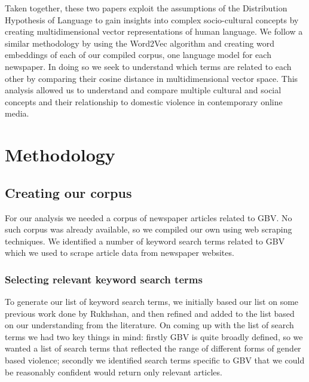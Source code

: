 \documentclass{article}
\begin{document}
{{Taken together, these two papers exploit the assumptions of the Distribution Hypothesis of Language to gain insights into complex socio-cultural concepts by creating multidimensional vector representations of human language. We follow a similar methodology by using the Word2Vec algorithm and creating word embeddings of each of our compiled corpus, one language model for each newspaper. In doing so we seek to understand which terms are related to each other by comparing their cosine distance in multidimensional vector space.  This analysis allowed us to understand and compare multiple cultural and social concepts and their relationship to domestic violence in contemporary online media. 
}

}
\newpage

\section{Methodology}{
	
\subsection{Creating our corpus}{

For our analysis we needed a corpus of newspaper articles related to GBV. No such corpus was already available, so we compiled our own using web scraping techniques. We identified a number of keyword search terms related to GBV which we used to scrape article data from newspaper websites. 

\subsubsection{Selecting relevant keyword search terms}{
To generate our list of keyword search terms, we initially based our list on some previous work done by Rukhshan, and then refined and added to the list based on our understanding from the literature. On coming up with the list of search terms we had two key things in mind: firstly GBV is quite broadly defined, so we wanted a list of search terms that reflected the range of different forms of gender based violence; secondly we identified search terms specific to GBV that we could be reasonably confident would return only relevant articles. 

}}}
\end{document}
